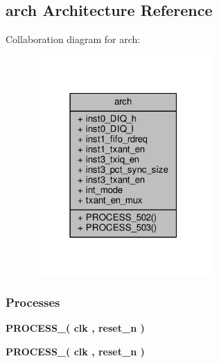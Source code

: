 \subsection{arch Architecture Reference}
\label{classfifo2diq_1_1arch}


Collaboration diagram for arch\+:\nopagebreak
\begin{figure}[H]
\begin{center}
\leavevmode
\includegraphics[width=195pt]{d8/d6b/classfifo2diq_1_1arch__coll__graph}
\end{center}
\end{figure}
\subsubsection*{Processes}
 \begin{DoxyCompactItemize}
\item 
{\bf P\+R\+O\+C\+E\+S\+S\+\_}{\bfseries  ( {\bfseries {\bfseries {\bf clk}} \textcolor{vhdlchar}{ }} , {\bfseries {\bfseries {\bf reset\+\_\+n}} \textcolor{vhdlchar}{ }} )}
\item 
{\bf P\+R\+O\+C\+E\+S\+S\+\_}{\bfseries  ( {\bfseries {\bfseries {\bf clk}} \textcolor{vhdlchar}{ }} , {\bfseries {\bfseries {\bf reset\+\_\+n}} \textcolor{vhdlchar}{ }} )}
\end{DoxyCompactItemize}
